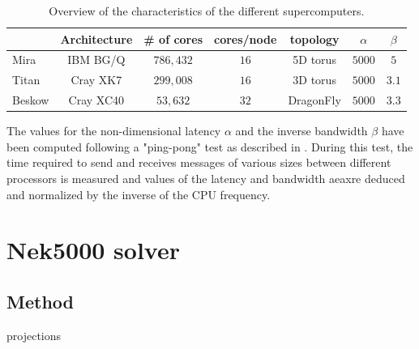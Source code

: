 \documentclass{sig-alternate}
\begin{document}
\begin{table}
\centering
\caption{Overview of the characteristics of the different supercomputers.}
\begin{tabular}{l|cccccc} 
\hline
 & Architecture & \# of cores & cores/node &topology& $\alpha$ & $\beta$\\
 \hline
Mira & IBM BG/Q & $786,432$ & $16$ & 5D torus & $5000$ & $5$\\ 
Titan & Cray XK7 & $299,008$ & $16$ &3D torus& $5000$ & $3.1$\\ 
Beskow & Cray XC40 & $53,632$ & $32$ &DragonFly & $5000$ & $3.3$\\
\hline
\end{tabular}
\label{tab:computer_charac}
\end{table}

The values for the non-dimensional latency $\alpha$ and the inverse bandwidth $\beta$ have been computed following a "ping-pong" test as described in \cite{fischer:scaling}. During this test, the time required to send and receives messages of various sizes between different processors is measured and values of the latency and bandwidth aeaxre deduced and normalized by the inverse of the CPU frequency.




\section{Nek5000 solver}

\subsection{Method}
projections
\end{document}
